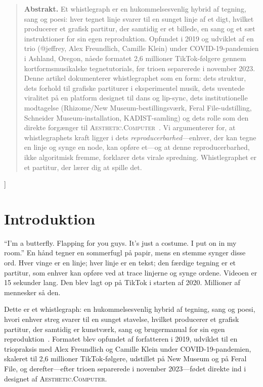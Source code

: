 \documentclass[10pt,letterpaper,twocolumn]{article}
\newcommand{\ac}{\textsc{Aesthetic.Computer}}
\begin{document}
{\begin{quote}
\small\noindent\textbf{Abstrakt.}
Et whistlegraph er en hukommelsesvenlig hybrid af tegning, sang og poesi: hver tegnet linje svarer til en sunget linje af et digt, hvilket producerer et grafisk partitur, der samtidig er et billede, en sang og et sæt instruktioner for sin egen reproduktion. Opfundet i 2019 og udviklet af en trio (@jeffrey, Alex Freundlich, Camille Klein) under COVID-19-pandemien i Ashland, Oregon, nåede formatet 2,6 millioner TikTok-følgere gennem kortformsmusikalske tegnetutorials, før trioen separerede i november 2023. Denne artikel dokumenterer whistlegraphet som en form: dets struktur, dets forhold til grafiske partiturer i eksperimentel musik, dets uventede viralitet på en platform designet til dans og lip-sync, dets institutionelle modtagelse (Rhizome/New Museum-bestillingsværk, Feral File-udstilling, Schneider Museum-installation, KADIST-samling) og dets rolle som den direkte forgænger til \ac{}~\citep{scudder2026ac}. Vi argumenterer for, at whistlegraphets kraft ligger i dets \emph{reproducerbarhed}---enhver, der kan tegne en linje og synge en node, kan opføre et---og at denne reproducerbarhed, ikke algoritmisk fremme, forklarer dets virale spredning. Whistlegraphet er et partitur, der lærer dig at spille det.
\end{quote}
\vspace{0.5em}
}]

\section{Introduktion}

``I'm a butterfly. Flapping for you guys. It's just a costume. I put on in my room.'' En hånd tegner en sommerfugl på papir, mens en stemme synger disse ord. Hver vinge er en linje; hver linje er en tekst; den færdige tegning er et partitur, som enhver kan opføre ved at trace linjerne og synge ordene. Videoen er 15 sekunder lang. Den blev lagt op på TikTok i starten af 2020. Millioner af mennesker så den.

Dette er et whistlegraph: en hukommelsesvenlig hybrid af tegning, sang og poesi, hvori enhver streg svarer til en sunget stavelse, hvilket producerer et grafisk partitur, der samtidig er kunstværk, sang og brugermanual for sin egen reproduktion~\citep{dirt2023whistlegraph}. Formatet blev opfundet af forfatteren i 2019, udviklet til en triopraksis med Alex Freundlich og Camille Klein under COVID-19-pandemien, skaleret til 2,6 millioner TikTok-følgere, udstillet på New Museum og på Feral File, og derefter---efter trioen separerede i november 2023---fødet direkte ind i designet af \ac{}.
\end{document}
